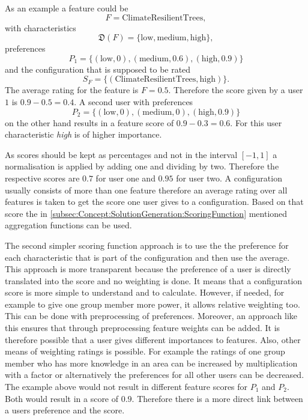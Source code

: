 As an example a feature could be
\begin{equation}
    F = \text{ClimateResilientTrees},
\end{equation} with characteristics
\begin{equation}
    \mathfrak{D}(F)= \{\text{low}, \text{medium}, \text{high}\},
\end{equation}
preferences
\begin{equation}
    P_1 = \{(\text{low}, 0), (\text{medium},0.6), (\text{high},0.9) \}
\end{equation} 
and the configuration that is supposed to be rated
\begin{equation}
    S_F = \{(\text{ClimateResilientTrees}, \text{high})\}.
\end{equation}
The average rating for the feature is $F = 0.5$. Therefore the score given by a user $1$ is $0.9-0.5 = 0.4$.
A second user with preferences 
\begin{equation}
    P_2 = \{(\text{low}, 0), (\text{medium},0), (\text{high},0.9) \}
\end{equation} 
on the other hand results in a feature score of $0.9-0.3=0.6$. For this user characteristic \emph{high} is of higher importance.

As scores should be kept as percentages and not in the interval $[-1,1]$ a normalisation is applied by adding one and dividing by two. Therefore the respective scores are $0.7$ for user one and $0.95$ for user two. A configuration usually consists of more than one feature therefore an average rating over all features is taken to get the score one user gives to a configuration. Based on that score the in \autoref{subsec:Concept:SolutionGeneration:ScoringFunction} mentioned aggregation functions can be used.

The second simpler scoring function approach is to use the the preference for each characteristic that is part of the configuration and then use the average. This approach is more transparent because the preference of a user is directly translated into the score and no weighting is done. It means that a configuration score is more simple to understand and to calculate. However, if needed, for example to give one group member more power, it allows relative weighting too. This can be done with preprocessing of preferences. Moreover, an approach like this ensures that through preprocessing feature weights can be added. It is therefore possible that a user gives different importances to features. Also, other means of weighting ratings is possible. For example the ratings of one group member who has more knowledge in an area can be increased by multiplication with a factor or alternatively the preferences for all other users can be decreased.
The example above would not result in different feature scores for $P_1$ and $P_2$. Both would result in a score of $0.9$. Therefore there is a more direct link between a users preference and the score. 

